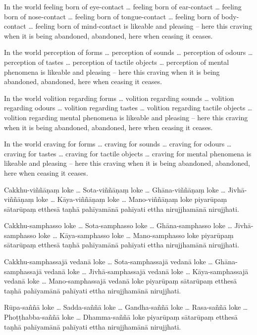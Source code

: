 In the world feeling born of eye-contact \ldots{} feeling born of ear-contact
\ldots{} feeling born of nose-contact \ldots{} feeling born of tongue-contact
\ldots{} feeling born of body-contact \ldots{} feeling born of mind-contact is
likeable and pleasing -- here this craving when it is being abandoned, abandoned,
here when ceasing it ceases.

In the world perception of forms \ldots{} perception of sounds \ldots{}
perception of odours \ldots{} perception of tastes \ldots{} perception of
tactile objects \ldots{} perception of mental phenomena is likeable and pleasing
-- here this craving when it is being abandoned, abandoned, here when ceasing it
ceases.

In the world volition regarding forms \ldots{} volition regarding sounds
\ldots{} volition regarding odours \ldots{} volition regarding tastes \ldots{}
volition regarding tactile objects \ldots{} volition regarding mental phenomena
is likeable and pleasing -- here this craving when it is being abandoned,
abandoned, here when ceasing it ceases.

In the world craving for forms \ldots{} craving for sounds \ldots{} craving for
odours \ldots{} craving for tastes \ldots{} craving for tactile objects \ldots{}
craving for mental phenomena is likeable and pleasing -- here this craving when
it is being abandoned, abandoned, here when ceasing it ceases.

\paliPage

Cakkhu-viññāṇaṃ loke \ldots{} Sota-viññāṇaṃ loke \ldots{} Ghāna-viññāṇaṃ loke
\ldots{} Jivhā-viññāṇaṃ loke \ldots{} Kāya-viññāṇaṃ loke \ldots{} Mano-viññāṇaṃ
loke piyarūpaṃ sātarūpaṃ etthesā taṇhā pahīyamānā pahīyati ettha nirujjhamānā
nirujjhati.

Cakkhu-samphasso loke \ldots{} Sota-samphasso loke \ldots{} Ghāna-samphasso loke
\ldots{} Jivhā-samphasso loke \ldots{} Kāya-samphasso loke \ldots{} Mano-samphasso
loke piyarūpaṃ sātarūpaṃ etthesā taṇhā pahīyamānā pahīyati ettha nirujjhamānā
nirujjhati.

Cakkhu-samphassajā vedanā loke \ldots{} Sota-samphassajā vedanā loke \ldots{}
Ghāna-samphassajā vedanā loke \ldots{} Jivhā-samphassajā vedanā loke \ldots{}
Kāya-samphassajā vedanā loke \ldots{} Mano-samphassajā vedanā loke piyarūpaṃ
sātarūpaṃ etthesā taṇhā pahīyamānā pahīyati ettha nirujjhamānā nirujjhati.

Rūpa-saññā loke \ldots{} Sadda-saññā loke \ldots{} Gandha-saññā loke \ldots{}
Rasa-saññā loke \ldots{} Phoṭṭhabba-saññā loke \ldots{} Dhamma-saññā loke piyarūpaṃ
sātarūpaṃ etthesā taṇhā pahīyamānā pahīyati ettha nirujjhamānā nirujjhati.

